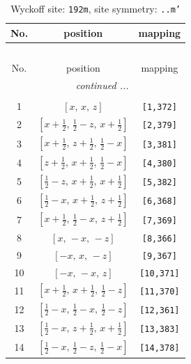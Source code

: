 \documentclass[fleqn,8pt]{jsarticle}
\begin{document}
\begin{longtable}{ccc}
\caption{Wyckoff site: {\tt 192m}, site symmetry: {\tt ..m'}}
 \\
 \hline \hline
No. & position & mapping \\ \hline \endfirsthead

\multicolumn{2}{l}{\tablename\ \thetable{}} \\
 \hline \hline
No. & position & mapping \\ \hline \endhead

 \hline \hline
\multicolumn{2}{r}{\footnotesize\it continued ...} \\ \endfoot

 \hline \hline
\multicolumn{2}{r}{} \\ \endlastfoot

1 & $\left[ x,\, x,\, z \right]$ & {\tt [1,372]} \\ \hline
2 & $\left[ x + \frac{1}{2},\, \frac{1}{2} - z,\, x + \frac{1}{2} \right]$ & {\tt [2,379]} \\ \hline
3 & $\left[ x + \frac{1}{2},\, z + \frac{1}{2},\, \frac{1}{2} - x \right]$ & {\tt [3,381]} \\ \hline
4 & $\left[ z + \frac{1}{2},\, x + \frac{1}{2},\, \frac{1}{2} - x \right]$ & {\tt [4,380]} \\ \hline
5 & $\left[ \frac{1}{2} - z,\, x + \frac{1}{2},\, x + \frac{1}{2} \right]$ & {\tt [5,382]} \\ \hline
6 & $\left[ \frac{1}{2} - x,\, x + \frac{1}{2},\, z + \frac{1}{2} \right]$ & {\tt [6,368]} \\ \hline
7 & $\left[ x + \frac{1}{2},\, \frac{1}{2} - x,\, z + \frac{1}{2} \right]$ & {\tt [7,369]} \\ \hline
8 & $\left[ x,\, - x,\, - z \right]$ & {\tt [8,366]} \\ \hline
9 & $\left[ - x,\, x,\, - z \right]$ & {\tt [9,367]} \\ \hline
10 & $\left[ - x,\, - x,\, z \right]$ & {\tt [10,371]} \\ \hline
11 & $\left[ x + \frac{1}{2},\, x + \frac{1}{2},\, \frac{1}{2} - z \right]$ & {\tt [11,370]} \\ \hline
12 & $\left[ \frac{1}{2} - x,\, \frac{1}{2} - x,\, \frac{1}{2} - z \right]$ & {\tt [12,361]} \\ \hline
13 & $\left[ \frac{1}{2} - x,\, z + \frac{1}{2},\, x + \frac{1}{2} \right]$ & {\tt [13,383]} \\ \hline
14 & $\left[ \frac{1}{2} - x,\, \frac{1}{2} - z,\, \frac{1}{2} - x \right]$ & {\tt [14,378]} \\ \hline

\end{longtable}
\end{document}
